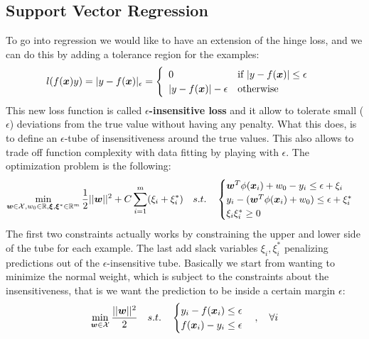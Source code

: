 \subsection{Support Vector Regression}
To go into regression we would like to have an extension of the hinge loss, and we can do this by adding a tolerance region for the examples:
\begin{equation}
  l(f(\bm{x})y)=\vert y-f(\bm{x})\vert_\epsilon=
  \begin{cases}
    \begin{array}{ll}
      0&\text{if }\vert y-f(\bm{x})\vert\leq \epsilon\\
      \vert y-f(\bm{x})\vert-\epsilon&\text{otherwise}
    \end{array}
  \end{cases}
  \label{eq:InsensitiveLoss}
\end{equation}
This new loss function is called $\epsilon$\textbf{-insensitive loss} and it allow to tolerate small ($\epsilon$) deviations from the true value without having any penalty. What this does, is to define an $\epsilon$-tube of insensitiveness around the true values. This also allows to trade off function complexity with data fitting by playing with $\epsilon$. 
The optimization problem is the following:
\begin{equation}
  \min\limits_{\bm{w}\in\mathcal{X},w_0\in\mathbb{R},\bm{\xi},\bm{\xi}^*\in\mathbb{R}^m}\frac{1}{2}\vert\vert\bm{w}\vert\vert^2+C\displaystyle\sum_{i=1}^m(\xi_i+\xi_i^*)\quad s.t.\quad 
  \begin{cases}
    \bm{w}^T\phi(\bm{x}_i)+w_0-y_i\leq \epsilon+\xi_i\\
    y_i-(\bm{w}^T\phi(\bm{x}_i)+w_0)\leq \epsilon+\xi_i^*\\
    \xi_i\xi_i^*\geq 0
  \end{cases}
  \label{eq:SVMRegression}
\end{equation}
The first two constraints actually works by constraining the upper and lower side of the tube for each example. The last add slack variables $\xi_i,\xi_i^*$ penalizing predictions out of the $\epsilon$-insensitive tube. \newline
Basically we start from wanting to minimize the normal weight, which is subject to the constraints about the insensitiveness, that is we want the prediction to be inside a certain margin $\epsilon$:
\[\min\limits_{\bm{w}\in\mathcal{X}}\frac{\vert\vert\bm{w}\vert\vert^2}{2}\quad s.t.\quad 
\begin{cases}
  y_i-f(\bm{x}_i)\leq \epsilon\\
  f(\bm{x}_i)-y_i\leq \epsilon
\end{cases},\quad\forall i
\]
